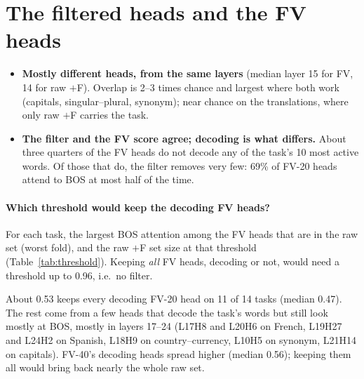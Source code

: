 \documentclass[10pt,a4paper]{article}
\begin{document}
\section{The filtered heads and the FV heads}

\begin{table}[H]\centering\small
\resizebox{\linewidth}{!}{}
\caption{Heads of raw $+$F and of FV-20 / FV-40, per task, mean of the two folds. Shared: in both. Chance: expected shared heads if the FV set were drawn at random within its layers. No decode: FV heads not in the unfiltered raw set. Filtered: FV heads in the raw set dropped by the BOS filter.}
\label{tab:overlap}
\end{table}

\begin{itemize}
\item \textbf{Mostly different heads, from the same layers} (median layer 15 for FV, 14 for raw $+$F). Overlap is 2--3 times chance and largest where both work (capitals, singular--plural, synonym); near chance on the translations, where only raw $+$F carries the task.
\item \textbf{The filter and the FV score agree; decoding is what differs.} About three quarters of the FV heads do not decode any of the task's 10 most active words. Of those that do, the filter removes very few: 69\% of FV-20 heads attend to BOS at most half of the time.
\end{itemize}

\paragraph{Which threshold would keep the decoding FV heads?} For each task, the largest BOS attention among the FV heads that are in the raw set (worst fold), and the raw $+$F set size at that threshold (Table~\ref{tab:threshold}). Keeping \emph{all} FV heads, decoding or not, would need a threshold up to 0.96, i.e.\ no filter.

\begin{table}[H]\centering\small

\caption{BOS threshold that keeps every decoding FV head (max over the two folds) and the raw $+$F set size at it (the two folds). The filter used 0.5.}
\label{tab:threshold}
\end{table}

About 0.53 keeps every decoding FV-20 head on 11 of 14 tasks (median 0.47). The rest come from a few heads that decode the task's words but still look mostly at BOS, mostly in layers 17--24 (L17H8 and L20H6 on French, L19H27 and L24H2 on Spanish, L18H9 on country--currency, L10H5 on synonym, L21H14 on capitals). FV-40's decoding heads spread higher (median 0.56); keeping them all would bring back nearly the whole raw set.
\end{document}
